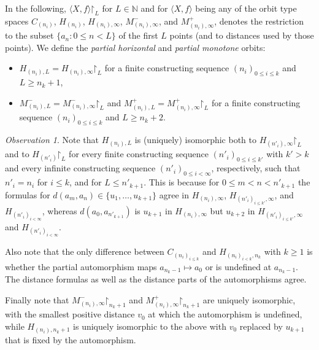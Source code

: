 \documentclass[oneside,notitlepage,12pt]{article}
\theoremstyle{definition}
\theoremstyle{remark}
\newtheorem{observation}[tw]{Observation}
\newcommand \set [1]{\{#1\}}
\newcommand \seq [1]{\langle #1 \rangle}
\newcommand \restr [1] {\mathord{\upharpoonright}_{#1}}
\newcommand \N {\mathbb{N}}
\begin{document}
In the following, $\seq{X, f}\restr{L}$ for $L \in \N$ and for $\seq{X, f}$ being any of the orbit type spaces $C_{(n_i)}$, $H_{(n_i)}$, $H_{(n_i),\infty}$, $M^-_{(n_i),\infty}$, and $M^+_{(n_i),\infty}$, denotes the restriction to the subset $\set{a_n: 0 \leq n < L}$ of the first $L$ points (and to distances used by those points).
We define the \emph{partial horizontal} and \emph{partial monotone} orbits:
\begin{itemize}
    \item $H_{(n_i), L} = H_{(n_i), \infty}\restr{L}$ for a finite constructing sequence $(n_i)_{0 \leq i \leq k}$ and $L \geq n_k + 1$,
    \item $M^-_{(n_i), L} = M^-_{(n_i), \infty}\restr{L}$ and $M^+_{(n_i), L} = M^+_{(n_i), \infty}\restr{L}$ for a finite constructing sequence $(n_i)_{0 \leq i \leq k}$ and $L \geq n_k + 2$.
\end{itemize}

\begin{observation} \label{obs:orbit_restrictions_isomorphic}
    Note that $H_{(n_i), L}$ is (uniquely) isomorphic both to $H_{(n'_i), \infty}\restr{L}$ and to $H_{(n'_i)}\restr{L}$ for every finite constructing sequence $(n'_i)_{0\leq i \leq k'}$ with $k' > k$ and every infinite constructing sequence $(n'_i)_{0\leq i < \infty}$, respectively, such that $n'_i = n_i$ for $i \leq k$, and for $L \leq n'_{k + 1}$.
    This is because for $0 \leq m < n < n'_{k + 1}$ the formulas for $d(a_m, a_n) \in \set{u_1, \ldots, u_{k + 1}}$ agree in $H_{(n_i), \infty}$, $H_{(n'_i)_{i\leq k'}, \infty}$, and $H_{(n'_i)_{i<\infty}}$, whereas $d(a_0, a_{n'_{k + 1}})$ is $u_{k + 1}$ in $H_{(n_i), \infty}$ but $u_{k + 2}$ in $H_{(n'_i)_{i\leq k'}, \infty}$ and $H_{(n'_i)_{i < \infty}}$.

    
    Also note that the only difference between $C_{(n_i)_{i\leq k}}$ and $H_{(n_i)_{i < k}, n_k}$ with $k \geq 1$ is whether the partial automorphism maps $a_{n_k - 1} \mapsto a_0$ or is undefined at $a_{n_k - 1}$.
    The distance formulas as well as the distance parts of the automorphisms agree.

    Finally note that $M^-_{(n_i),\infty}\restr{n_k + 1}$ and $M^+_{(n_i),\infty}\restr{n_k + 1}$ are uniquely isomorphic, with the smallest positive distance $v_0$ at which the automorphism is undefined, while $H_{(n_i), n_k + 1}$ is uniquely isomorphic to the above with $v_0$ replaced by $u_{k + 1}$ that is fixed by the automorphism.
    
\end{observation}
\end{document}
